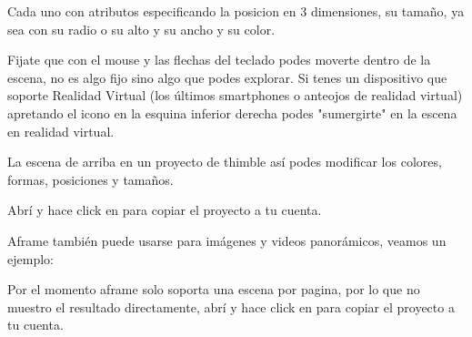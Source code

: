 \documentclass[letterpaper,10pt,spanish]{sphinxmanual}
\begin{document}
Cada uno con atributos especificando la posicion en 3 dimensiones, su tamaño,
ya sea con su radio o su alto y su ancho y su color.

Fijate que con el mouse y las flechas del teclado podes moverte dentro de la
escena, no es algo fijo sino algo que podes explorar. Si tenes un dispositivo
que soporte Realidad Virtual (los últimos smartphones o anteojos de realidad
virtual) apretando el icono en la esquina inferior derecha podes "sumergirte"
en la escena en realidad virtual.

La escena de arriba en un proyecto de thimble así podes modificar los colores,
formas, posiciones y tamaños.

Abrí  y hace click en 
para copiar el proyecto a tu cuenta.

Aframe también puede usarse para imágenes y videos panorámicos, veamos un ejemplo:

%
\begin{sphinxVerbatim}[commandchars=\\\{\}]
 
         
            

             
\end{sphinxVerbatim}

Por el momento aframe solo soporta una escena por pagina, por lo que no muestro
el resultado directamente, abrí
 y hace click en  para
copiar el proyecto a tu cuenta.
\end{document}
